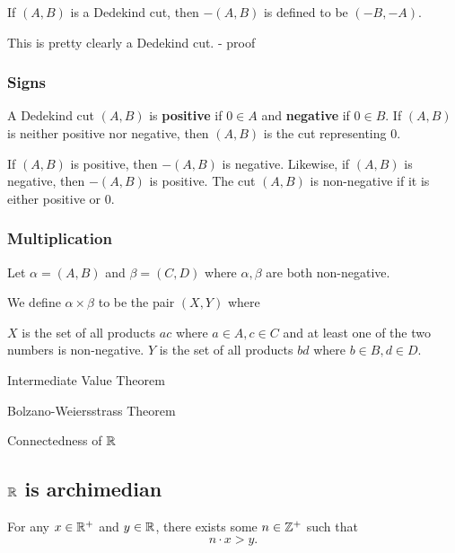 If $(A,B)$ is a Dedekind cut, then $-(A,B)$ is defined to be
$(-B,-A)$.

This is pretty clearly a Dedekind cut. - proof

\subsubsection{Signs}
A Dedekind cut $(A,B)$ is \textbf{positive} if $0 \in A$ and \textbf{negative} if $0 \in B$. If $(A,B)$ is neither positive nor negative, then $(A,B)$ is the cut representing 0.

If $(A,B)$ is positive, then $-(A,B)$ is negative. Likewise, if $(A,B)$ is negative, then $-(A,B)$ is positive. The cut $(A,B)$ is non-negative if it is either positive or 0.

\subsubsection{Multiplication}

Let $\alpha = (A,B)$ and $\beta = (C,D)$ where $\alpha, \beta$ are both non-negative.

We define $\alpha \times \beta$ to be the pair $(X,Y)$ where

$X$ is the set of all products $ac$ where $a \in A, c \in C$ and at least one of the two numbers is non-negative. 
$Y$ is the set of all products $bd$ where $b \in B, d \in D$.




Intermediate Value Theorem

Bolzano-Weiersstrass Theorem

Connectedness of $\mathbb R$

\subsection{$\mathbb R$ is archimedian}
\begin{theorem}\label{thrm:archimedian}
For any $x\in\mathbb R^+$ and $y\in\mathbb R$, there exists some $n\in\mathbb Z^+$ such that
\[ n\cdot x>y. \]
\end{theorem}

